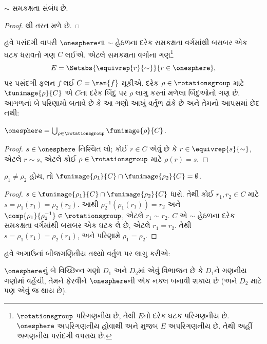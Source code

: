\begin{lem}
$\sim$ સમકક્ષતા સંબંધ છે.
\end{lem}

\begin{proof}
થી તરત મળે છે.
\end{proof}

હવે પસંદગી વાપરી $\onesphere$ના
$\sim$ હેઠળના દરેક સમકક્ષતા વર્ગમાંથી
બરાબર એક ઘટક ધરાવતો ગણ $C$ લઈએ.
એટલે સમકક્ષતા વર્ગોના
ગણ\footnote{$\rotationsgroup$ પરિગણનીય છે,
તેથી $E$નો દરેક ઘટક
પરિગણનીય છે.
$\onesphere$ અપરિગણનીય હોવાથી
 અને
મુજબ $E$ અપરિગણનીય છે. તેથી અહીં
\emph{અ}ગણનીય પસંદગી વપરાય છે.}
\[
	E = \Setabs{\equivrep{r}{\sim}}{r \in \onesphere},
\]
પર પસંદગી ફલન $f$ લઈ
$C = \ran{f}$ મૂકીએ.
દરેક $\rho \in \rotationsgroup$
માટે $\funimage{\rho}{C}$ એ $C$ના
દરેક બિંદુ પર $\rho$ લાગુ કરતાં
મળેલા બિંદુઓનો ગણ છે. આગળનાં
બે પરિણામો બતાવે છે કે આ ગણો
આખું વર્તુળ ઢાંકે છે અને તેમનો
આપસમાં છેદ નથી:

\begin{lem}
$\onesphere = \bigcup_{\rho \in \rotationsgroup} \funimage{\rho}{C}$.
\end{lem}

\begin{proof}
$s \in \onesphere$ નિશ્ચિત લો;
કોઈ $r \in C$ એવું છે કે
$r \in \equivrep{s}{\sim}$,
એટલે $r \sim s$, એટલે કોઈ
$\rho \in \rotationsgroup$ માટે
$\rho(r) = s$.
\end{proof}

\begin{lem}
$\rho_1 \neq \rho_2$ હોય, તો
$\funimage{\rho_1}{C} \cap \funimage{\rho_2}{C} = \emptyset$.
\end{lem}

\begin{proof}
$s \in \funimage{\rho_{1}}{C} \cap
\funimage{\rho_{2}}{C}$ ધારો.
તેથી કોઈ $r_{1}, r_{2} \in C$ માટે
$s = \rho_{1}(r_{1}) = \rho_{2}(r_{2})$.
આથી $\rho^{-1}_2(\rho_1(r_1)) = r_2$
અને $\comp{\rho_1}{\rho^{-1}_2} \in
\rotationsgroup$, એટલે $r_{1} \sim
r_{2}$. $C$ એ $\sim$ હેઠળના
દરેક સમકક્ષતા વર્ગમાંથી
બરાબર એક ઘટક લે છે, એટલે
$r_1 = r_2$. તેથી
$s = \rho_1(r_1) = \rho_2(r_1)$,
અને પરિણામે $\rho_1 = \rho_2$.
\end{proof}

હવે અગાઉનાં બીજગણિતીય તથ્યો
વર્તુળ પર લાગુ કરીએ:

\begin{lem}
$\onesphere$નું બે વિચ્છિન્ન ગણો
$D_{1}$ અને $D_{2}$માં એવું
વિભાજન છે કે $D_{1}$ને ગણનીય
ગણોમાં વહેંચી, તેમને ફેરવીને
$\onesphere$ની એક નકલ બનાવી
શકાય છે (અને $D_{2}$ માટે પણ
એવું જ થાય છે).
\end{lem}

